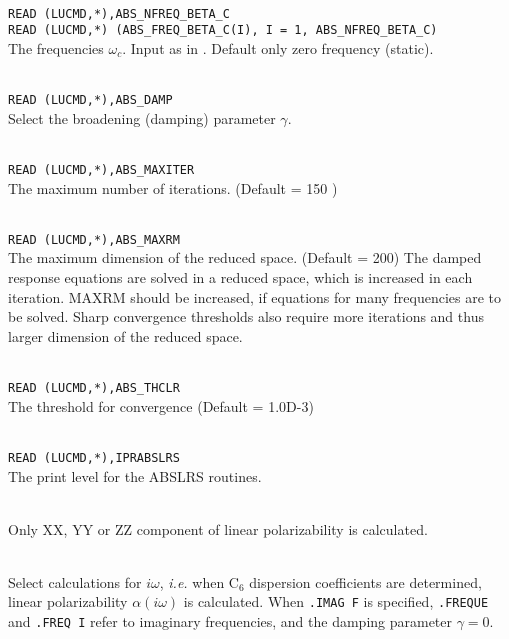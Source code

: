 \begin{description}
\item{} \\
\verb|READ (LUCMD,*),ABS_NFREQ_BETA_C |\\
\verb|READ (LUCMD,*) (ABS_FREQ_BETA_C(I), I = 1, ABS_NFREQ_BETA_C) | \\
The frequencies
$\omega_c$. Input as in .
Default only zero frequency (static).

\item{}      \\
\verb|READ (LUCMD,*),ABS_DAMP |\\
   Select the broadening (damping) parameter $\gamma$.

\item{}      \\
\verb|READ (LUCMD,*),ABS_MAXITER |\\
   The maximum number of iterations.  (Default
= 150 )

\item{}      \\
\verb|READ (LUCMD,*),ABS_MAXRM |\\
   The maximum dimension of the reduced space. 
(Default = 200) The damped response equations are solved in
a reduced space, which is increased
in each iteration. MAXRM should be increased, if equations for many
frequencies are to be solved. Sharp convergence thresholds also require
more iterations and thus larger dimension of the reduced space.

\item{}     \\
\verb|READ (LUCMD,*),ABS_THCLR|\\
   The threshold for convergence (Default = 1.0D-3)

\item{}     \\
\verb|READ (LUCMD,*),IPRABSLRS |\\
   The print level for the ABSLRS routines.

\item{}     \\
     Only XX, YY or ZZ component of linear polarizability is calculated.

\item{} \\
   Select calculations for $i\omega$, {\it i.e.} when C$_6$ dispersion
coefficients are determined, linear polarizability $\alpha(i\omega)$ is
calculated. When \verb|.IMAG F| is specified, \verb|.FREQUE| and \verb|.FREQ I|
refer to imaginary frequencies, and the damping
parameter $\gamma = 0$.


\end{description}

